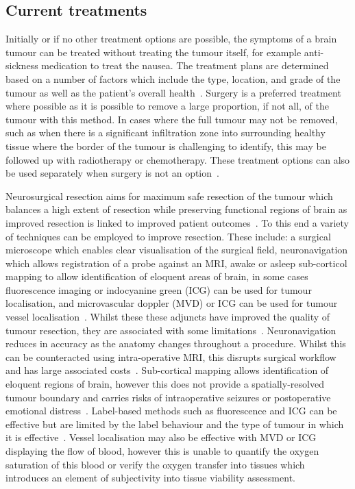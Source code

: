 \subsection{Current treatments}\label{sec:introtumourtreatments}
Initially or if no other treatment options are possible, the symptoms of a brain tumour can be treated without treating the tumour itself, for example anti-sickness medication to treat the nausea. The treatment plans are determined based on a number of factors which include the type, location, and grade of the tumour as well as the patient's overall health~\cite{NationalHealthService2023}. Surgery is a preferred treatment where possible as it is possible to remove a large proportion, if not all, of the tumour with this method. In cases where the full tumour may not be removed, such as when there is a significant infiltration zone into surrounding healthy tissue where the border of the tumour is challenging to identify, this may be followed up with radiotherapy or chemotherapy. These treatment options can also be used separately when surgery is not an option~\cite{MacmillanCancerSupport2019}. 

Neurosurgical resection aims for maximum safe resection of the tumour which balances a high extent of resection while preserving functional regions of brain as improved resection is linked to improved patient outcomes~\cite{Chanbour2022}. To this end a variety of techniques can be employed to improve resection. These include: a surgical microscope which enables clear visualisation of the surgical field, neuronavigation which allows registration of a probe against an MRI, awake or asleep sub-corticol mapping to allow identification of eloquent areas of brain, in some cases fluorescence imaging or indocyanine green (ICG) can be used for tumour localisation, and microvascular doppler (MVD) or ICG can be used for tumour vessel localisation~\cite{Chanbour2022, Catapano2018}.
Whilst these these adjuncts have improved the quality of tumour resection, they are associated with some limitations~\cite{Chanbour2022}. Neuronavigation reduces in accuracy as the anatomy changes throughout a procedure. Whilst this can be counteracted using intra-operative MRI, this disrupts surgical workflow and has large associated costs~\cite{Chanbour2022}. Sub-cortical mapping allows identification of eloquent regions of brain, however this does not provide a spatially-resolved tumour boundary and carries risks of intraoperative seizures or postoperative emotional distress~\cite{Chanbour2022}. Label-based methods such as fluorescence and ICG can be effective but are limited by the label behaviour and the type of tumour in which it is effective~\cite{Chanbour2022}. Vessel localisation may also be effective with MVD or ICG displaying the flow of blood, however this is unable to quantify the oxygen saturation of this blood or verify the oxygen transfer into tissues which introduces an element of subjectivity into tissue viability assessment. 

